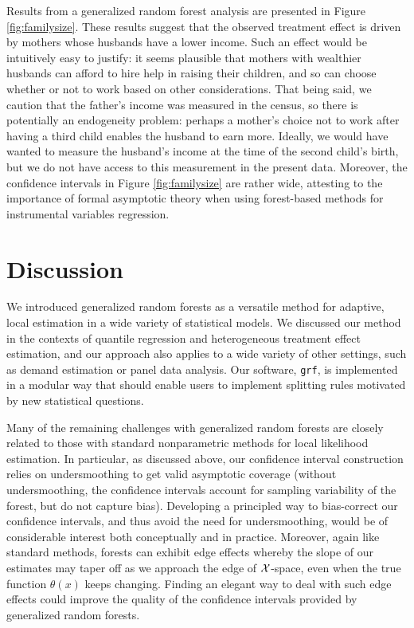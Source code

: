 \documentclass[aos]{imsart}
\theoremstyle{plain}
\theoremstyle{definition}
\theoremstyle{remark}
\begin{document}
\begin{CJK}{UTF8}{gbsn}
Results from a generalized random forest analysis are presented in Figure \ref{fig:familysize}. These results suggest that
the observed treatment effect is driven by mothers whose husbands have a lower income. Such an effect would
be intuitively easy to justify: it seems plausible that mothers with wealthier husbands can afford to hire help in raising their children,
and so can choose whether or not to work based on other considerations. That being said, we caution
that the father's income was measured in the census, so there is potentially an endogeneity
problem: perhaps a mother's choice not to work after having a third child enables the husband to earn more.
Ideally, we would have wanted to measure the husband's income at the time of the second child's birth, but
we do not have access to this measurement in the present data. Moreover, the confidence intervals in Figure \ref{fig:familysize}
are rather wide, attesting to the importance of formal asymptotic theory when using forest-based methods for instrumental
variables regression.

\section{Discussion}

We introduced generalized random forests as a versatile method for adaptive,
local estimation in a wide variety of statistical models. We discussed our method
in the contexts of quantile regression and heterogeneous treatment effect estimation,
and our approach also applies to a wide variety of other settings, such as
demand estimation or panel data analysis. Our software, \texttt{grf},
is implemented in a modular way that should enable users to implement
splitting rules motivated by new statistical questions.

Many of the remaining challenges with generalized random forests are closely related to
those with standard nonparametric methods for local likelihood estimation. In particular, as discussed
above, our confidence interval construction relies on undersmoothing to get valid asymptotic
coverage (without undersmoothing, the confidence intervals account for sampling variability of
the forest, but do not capture bias). Developing a principled way to bias-correct our confidence
intervals, and thus avoid the need for undersmoothing, would be of considerable interest both
conceptually and in practice. Moreover, again like standard methods, forests can exhibit edge
effects whereby the slope of our estimates  may taper off
as we approach the edge of $\mathcal{X}$-space, even when the true function $\theta(x)$ keeps
changing. Finding an elegant way to deal with such edge effects could improve the
quality of the confidence intervals provided by generalized random forests.


\end{CJK}
\end{document}
